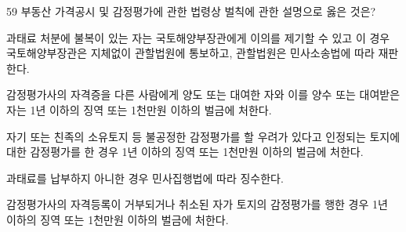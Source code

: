 \begin{question}{59}
부동산 가격공시 및 감정평가에 관한 법령상 벌칙에 관한 설명으로 옳은 것은?
\begin{choices}
  \item 과태료 처분에 불복이 있는 자는 국토해양부장관에게 이의를 제기할 수 있고 이 경우 국토해양부장관은 지체없이 관할법원에 통보하고, 관할법원은 민사소송법에 따라 재판한다.
  \item 감정평가사의 자격증을 다른 사람에게 양도 또는 대여한 자와 이를 양수 또는 대여받은 자는 1년 이하의 징역 또는 1천만원 이하의 벌금에 처한다.
  \item 자기 또는 친족의 소유토지 등 불공정한 감정평가를 할 우려가 있다고 인정되는 토지에 대한 감정평가를 한 경우 1년 이하의 징역 또는 1천만원 이하의 벌금에 처한다.
  \item 과태료를 납부하지 아니한 경우 민사집행법에 따라 징수한다.
  \item 감정평가사의 자격등록이 거부되거나 취소된 자가 토지의 감정평가를 행한 경우 1년 이하의 징역 또는 1천만원 이하의 벌금에 처한다.
\end{choices}
\end{question}
